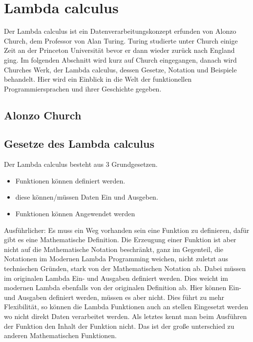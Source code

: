 \section{Lambda calculus}
Der Lambda calculus ist ein Datenverarbeitungskonzept erfunden von Alonzo Church, dem Professor von Alan Turing. Turing studierte unter Church einige Zeit an der Princeton Universität bevor er dann wieder zurück nach England ging. Im folgenden Abschnitt wird kurz auf Church eingegangen, danach wird Churches Werk, der Lambda calculus, dessen Gesetze, Notation und Beispiele behandelt. Hier wird ein Einblick in die Welt der funktionellen Programmiersprachen und ihrer Geschichte gegeben.
\subsection{Alonzo Church}
\subsection{Gesetze des Lambda calculus}
Der Lambda calculus besteht aus 3 Grundgesetzen.
\begin{itemize}
\item Funktionen können definiert werden.
\item diese können/müssen Daten Ein und Ausgeben.
\item Funktionen können Angewendet werden
\end{itemize}
Ausführlicher: Es muss ein Weg vorhanden sein eine Funktion zu definieren, dafür gibt es eine Mathematische Definition. Die Erzeugung einer Funktion ist aber nicht auf die Mathematische Notation beschränkt, ganz im Gegenteil, die Notationen im Modernen Lambda Programming weichen, nicht zuletzt aus technischen Gründen, stark von der Mathematischen Notation ab. Dabei müssen im originalen Lambda Ein- und Ausgaben definiert werden. Dies weicht im modernen Lambda ebenfalls von der originalen Definition ab. Hier können Ein- und Ausgaben definiert werden, müssen es aber nicht. Dies führt zu mehr Flexibilität, so können die Lambda Funktionen auch an stellen Eingesetzt werden wo nicht direkt Daten verarbeitet werden. Als letztes kennt man beim Ausführen der Funktion den Inhalt der Funktion nicht. Das ist der große unterschied zu anderen Mathematischen Funktionen.\cite{lambdacalculus}
